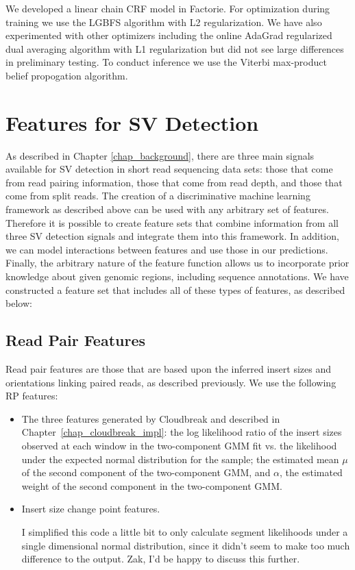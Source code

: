 

We developed a linear chain CRF model in Factorie. For optimization during training we use the LGBFS algorithm with L2 regularization. We have also experimented with other optimizers including the online AdaGrad regularized dual averaging algorithm \cite{Duchi:2011:ASM:1953048.2021068} with L1 regularization but did not see large differences in preliminary testing. To conduct inference we use the Viterbi max-product belief propogation algorithm.

\section{Features for SV Detection}

As described in Chapter \ref{chap_background}, there are three main signals available for SV detection in short read sequencing data sets: those that come from read pairing information, those that come from read depth, and those that come from split reads. The creation of a discriminative machine learning framework as described above can be used with any arbitrary set of features. Therefore it is possible to create feature sets that combine information from all three SV detection signals and integrate them into this framework. In addition, we can model interactions between features and use those in our predictions. Finally, the arbitrary nature of the feature function allows us to incorporate prior knowledge about given genomic regions, including sequence annotations. We have constructed a feature set that includes all of these types of features, as described below:

\subsection{Read Pair Features}

Read pair features are those that are based upon the inferred insert sizes and orientations linking paired reads, as described previously. We use the following RP features:

\begin{itemize}

\item The three features generated by Cloudbreak and described in Chapter~\ref{chap_cloudbreak_impl}: the log likelihood ratio of the insert sizes observed at each window in the two-component GMM fit vs. the likelihood under the expected normal distribution for the sample; the estimated mean $\mu$ of the second component of the two-component GMM, and $\alpha$, the estimated weight of the second component in the two-component GMM.

\item Insert size change point features. 

I simplified this code a little bit to only calculate segment likelihoods under a single dimensional normal distribution, since it didn't seem to make too much difference to the output. Zak, I'd be happy to discuss this further.
\end{itemize}

